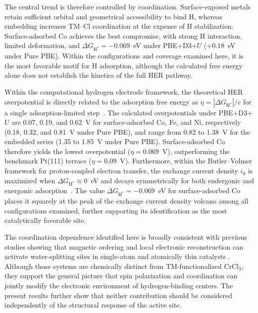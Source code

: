 \documentclass[journal=jacsat,manuscript=article]{achemso}
\begin{document}
{\color{revcolor}%
  The central trend is therefore controlled by coordination. Surface-exposed metals retain sufficient orbital and geometrical accessibility to bind H, whereas embedding increases TM--Cl coordination at the expense of H stabilization. Surface-adsorbed Co achieves the best compromise, with strong H interaction, limited deformation, and $\Delta G_{\mathrm{H}^*}=-0.069$~eV under PBE+D3+$U$ ($+0.18$~eV under Pure PBE). Within the configurations and coverage examined here, it is the most favorable motif for H adsorption, although the calculated free energy alone does not establish the kinetics of the full HER pathway.
\par}

{\color{revcolor}%
  Within the computational hydrogen electrode framework, the theoretical HER overpotential is directly related to the adsorption free energy as $\eta = |\Delta G_{\mathrm{H}^*}|/e$ for a single adsorption-limited step~\cite{Norskov_2005,Moraes2026,ASS2026_166886}. The calculated overpotentials under PBE+D3+$U$ are 0.07, 0.19, and 0.62~V for surface-adsorbed Co, Fe, and Ni, respectively (0.18, 0.32, and 0.81~V under Pure PBE), and range from 0.82 to 1.38~V for the embedded series (1.35 to 1.85~V under Pure PBE). Surface-adsorbed Co therefore yields the lowest overpotential ($\eta = 0.069$~V), outperforming the benchmark Pt(111) terrace ($\eta = 0.09$~V). Furthermore, within the Butler--Volmer framework for proton-coupled electron transfer, the exchange current density $i_0$ is maximized when $\Delta G_{\mathrm{H}^*} \approx 0$~eV and decays symmetrically for both endergonic and exergonic adsorption~\cite{Norskov_2005}. The value $\Delta G_{\mathrm{H}^*} = -0.069$~eV for surface-adsorbed Co places it squarely at the peak of the exchange current density volcano among all configurations examined, further supporting its identification as the most catalytically favorable site.
\par}

The coordination dependence identified here is broadly consistent with previous studies showing that magnetic ordering and local electronic reconstruction can activate water-splitting sites in single-atom and atomically thin catalysts \cite{Sun2023,Duan2021}. Although those systems are chemically distinct from TM-functionalized CrCl$_3$, they support the general picture that spin polarization and coordination can jointly modify the electronic environment of hydrogen-binding centers. The present results further show that neither contribution should be considered independently of the structural response of the active site.
\end{document}
